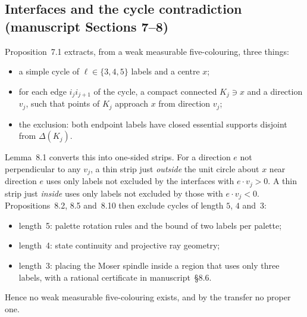 \documentclass[11pt]{article}
\theoremstyle{definition}
\theoremstyle{remark}
\begin{document}
\subsection{Interfaces and the cycle contradiction (manuscript Sections 7--8)}
Proposition~7.1 extracts, from a weak measurable five-colouring, three things:
\begin{itemize}
\item a simple cycle of $\ell\in\{3,4,5\}$ labels and a centre $x$;
\item for each edge $i_ji_{j+1}$ of the cycle, a compact connected $K_j\ni x$ and a direction $v_j$, such that points of $K_j$ approach $x$ from direction $v_j$;
\item the exclusion: both endpoint labels have closed essential supports disjoint from $\Delta(K_j)$.
\end{itemize}
Lemma~8.1 converts this into one-sided strips. For a direction $e$ not perpendicular to any $v_j$, a thin strip just \emph{outside} the unit circle about $x$ near direction $e$ uses only labels not excluded by the interfaces with $e\cdot v_j>0$. A thin strip just \emph{inside} uses only labels not excluded by those with $e\cdot v_j<0$. Propositions~8.2, 8.5 and~8.10 then exclude cycles of length $5$, $4$ and~$3$:
\begin{itemize}
\item length~5: palette rotation rules and the bound of two labels per palette;
\item length~4: state continuity and projective ray geometry;
\item length~3: placing the Moser spindle inside a region that uses only three labels, with a rational certificate in manuscript~\S8.6.
\end{itemize}
Hence no weak measurable five-colouring exists, and by the transfer no proper one.
\end{document}
